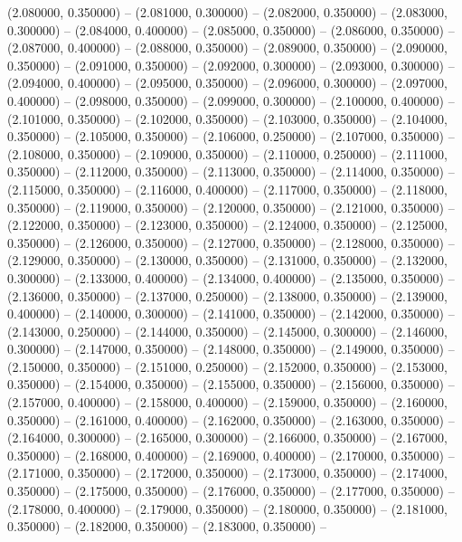 (2.080000, 0.350000) -- 
(2.081000, 0.300000) -- 
(2.082000, 0.350000) -- 
(2.083000, 0.300000) -- 
(2.084000, 0.400000) -- 
(2.085000, 0.350000) -- 
(2.086000, 0.350000) -- 
(2.087000, 0.400000) -- 
(2.088000, 0.350000) -- 
(2.089000, 0.350000) -- 
(2.090000, 0.350000) -- 
(2.091000, 0.350000) -- 
(2.092000, 0.300000) -- 
(2.093000, 0.300000) -- 
(2.094000, 0.400000) -- 
(2.095000, 0.350000) -- 
(2.096000, 0.300000) -- 
(2.097000, 0.400000) -- 
(2.098000, 0.350000) -- 
(2.099000, 0.300000) -- 
(2.100000, 0.400000) -- 
(2.101000, 0.350000) -- 
(2.102000, 0.350000) -- 
(2.103000, 0.350000) -- 
(2.104000, 0.350000) -- 
(2.105000, 0.350000) -- 
(2.106000, 0.250000) -- 
(2.107000, 0.350000) -- 
(2.108000, 0.350000) -- 
(2.109000, 0.350000) -- 
(2.110000, 0.250000) -- 
(2.111000, 0.350000) -- 
(2.112000, 0.350000) -- 
(2.113000, 0.350000) -- 
(2.114000, 0.350000) -- 
(2.115000, 0.350000) -- 
(2.116000, 0.400000) -- 
(2.117000, 0.350000) -- 
(2.118000, 0.350000) -- 
(2.119000, 0.350000) -- 
(2.120000, 0.350000) -- 
(2.121000, 0.350000) -- 
(2.122000, 0.350000) -- 
(2.123000, 0.350000) -- 
(2.124000, 0.350000) -- 
(2.125000, 0.350000) -- 
(2.126000, 0.350000) -- 
(2.127000, 0.350000) -- 
(2.128000, 0.350000) -- 
(2.129000, 0.350000) -- 
(2.130000, 0.350000) -- 
(2.131000, 0.350000) -- 
(2.132000, 0.300000) -- 
(2.133000, 0.400000) -- 
(2.134000, 0.400000) -- 
(2.135000, 0.350000) -- 
(2.136000, 0.350000) -- 
(2.137000, 0.250000) -- 
(2.138000, 0.350000) -- 
(2.139000, 0.400000) -- 
(2.140000, 0.300000) -- 
(2.141000, 0.350000) -- 
(2.142000, 0.350000) -- 
(2.143000, 0.250000) -- 
(2.144000, 0.350000) -- 
(2.145000, 0.300000) -- 
(2.146000, 0.300000) -- 
(2.147000, 0.350000) -- 
(2.148000, 0.350000) -- 
(2.149000, 0.350000) -- 
(2.150000, 0.350000) -- 
(2.151000, 0.250000) -- 
(2.152000, 0.350000) -- 
(2.153000, 0.350000) -- 
(2.154000, 0.350000) -- 
(2.155000, 0.350000) -- 
(2.156000, 0.350000) -- 
(2.157000, 0.400000) -- 
(2.158000, 0.400000) -- 
(2.159000, 0.350000) -- 
(2.160000, 0.350000) -- 
(2.161000, 0.400000) -- 
(2.162000, 0.350000) -- 
(2.163000, 0.350000) -- 
(2.164000, 0.300000) -- 
(2.165000, 0.300000) -- 
(2.166000, 0.350000) -- 
(2.167000, 0.350000) -- 
(2.168000, 0.400000) -- 
(2.169000, 0.400000) -- 
(2.170000, 0.350000) -- 
(2.171000, 0.350000) -- 
(2.172000, 0.350000) -- 
(2.173000, 0.350000) -- 
(2.174000, 0.350000) -- 
(2.175000, 0.350000) -- 
(2.176000, 0.350000) -- 
(2.177000, 0.350000) -- 
(2.178000, 0.400000) -- 
(2.179000, 0.350000) -- 
(2.180000, 0.350000) -- 
(2.181000, 0.350000) -- 
(2.182000, 0.350000) -- 
(2.183000, 0.350000) -- 

